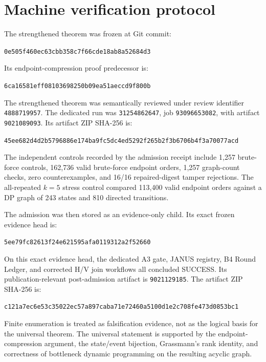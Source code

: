 \section{Machine verification protocol}

\newcommand{\janusid}[1]{\par\begingroup\centering\texttt{#1}\par\endgroup}

The strengthened theorem was frozen at Git commit:
\janusid{0e505f460ec63cbb358c7f66cde18ab8a52684d3}
Its endpoint-compression proof predecessor is:
\janusid{6ca16581eff08103698250b09ea51aeccd9f800b}
The strengthened theorem was semantically reviewed under review identifier \texttt{4888719957}.  The dedicated run was \texttt{31254862647}, job \texttt{93096653082}, with artifact \texttt{9021089093}.  Its artifact ZIP SHA-256 is:
\janusid{45ee682d4d2b5796886e174ba9fc5dc4ed5292f265b2f3b6706b4f3a70077acd}

The independent controls recorded by the admission receipt include 1,257 brute-force controls, 162,736 valid brute-force endpoint orders, 1,257 graph-count checks, zero counterexamples, and 16/16 repaired-digest tamper rejections.  The all-repeated $k=5$ stress control compared 113,400 valid endpoint orders against a DP graph of 243 states and 810 directed transitions.

The admission was then stored as an evidence-only child.  Its exact frozen evidence head is:
\janusid{5ee79fc82613f24e621595afa0119312a2f52660}
On this exact evidence head, the dedicated A3 gate, JANUS registry, B4 Round Ledger, and corrected H/V join workflows all concluded SUCCESS.  Its publication-relevant post-admission artifact is \texttt{9021129185}.  The artifact ZIP SHA-256 is:
\janusid{c121a7ec6e53c35022ec57a897caba71e72460a5100d1e2c708fe473d0853bc1}

Finite enumeration is treated as falsification evidence, not as the logical basis for the universal theorem.  The universal statement is supported by the endpoint-compression argument, the state/event bijection, Grassmann's rank identity, and correctness of bottleneck dynamic programming on the resulting acyclic graph.
